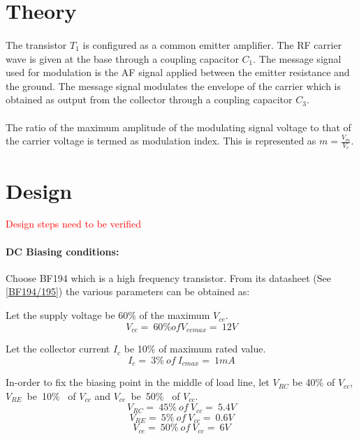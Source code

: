 \documentclass{book}
\begin{document}
\section*{Theory}
\paragraph{}
	The transistor $T_1$ is configured as a common emitter amplifier. The RF carrier wave is given at the base through a coupling capacitor $C_1$.  The message signal used for modulation is the AF signal applied between the emitter resistance and the ground. The message signal modulates the envelope of the carrier which is obtained as output from the collector through a coupling capacitor $C_3$. 
\paragraph{}
The ratio of the maximum amplitude of the modulating signal voltage to that of the carrier voltage is termed as modulation index. This is represented as $m=\frac{V_m}{V_c}$.


\section*{Design}
\textcolor{red}{Design steps need to be verified}

\paragraph{DC Biasing conditions:}
Choose BF194 which is a high frequency transistor. From its datasheet (See \ref{BF194/195}) the various parameters can be obtained as:

 
Let the supply voltage be 60\% of the maximum $V_{ce}$.  \begin{equation}
V_{cc}=\ 60\% of V_{cemax}=\ 12 V
\end{equation}

\noindent Let the collector current $I_c$ be 10\% of maximum rated value.
\begin{equation}
I_{c}=\ 3\% \ of \ I_{cmax}=\ 1 mA
\end{equation}

\noindent In-order to fix the biasing point in the middle of load line, let $V_{RC}$ be 40\% of $V_{cc}$, $V_{RE}$\ be\ 10\% \ of $V_{cc}$ and $V_{ce}$\  be\ 50\% \ of $V_{cc}$.
\begin{equation}
V_{RC}=\ 45\% \ of \ V_{cc}=\ 5.4V
\end{equation}
\begin{equation}
V_{RE}=\ 5\% \ of \ V_{cc}=\ 0.6V
\end{equation}
\begin{equation}
V_{ce}=\ 50\% \ of \ V_{cc}=\ 6V
\end{equation}
\end{document}
